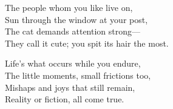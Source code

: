 \begin{lyrics}
The people whom you like live on,\\
Sun through the window at your post,\\
The cat demands attention strong—\\
They call it cute; you spit its hair the most.

Life’s what occurs while you endure,\\
The little moments, small frictions too,\\
Mishaps and joys that still remain,\\
Reality or fiction, all come true.
\end{lyrics}

